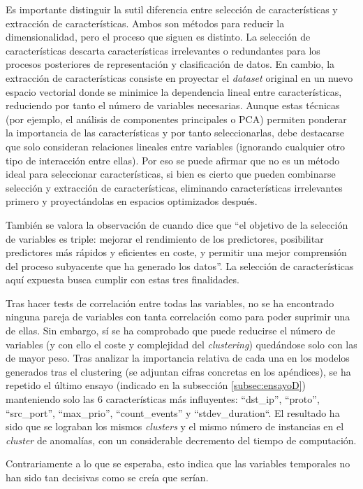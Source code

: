 Es importante distinguir la sutil diferencia entre selección de características y extracción de características.
Ambos son métodos para reducir la dimensionalidad, pero el proceso que siguen es distinto.
La selección de características descarta características irrelevantes o redundantes para los procesos posteriores de representación y clasificación de datos.
En cambio, la extracción de características consiste en proyectar el \emph{dataset} original en un nuevo espacio vectorial
donde se minimice la dependencia lineal entre características, reduciendo por tanto el número de variables necesarias.
Aunque estas técnicas (por ejemplo, el análisis de componentes principales o PCA) permiten ponderar la importancia de las características y por tanto seleccionarlas,
debe destacarse que solo consideran relaciones lineales entre variables (ignorando cualquier otro tipo de interacción entre ellas).
Por eso se puede afirmar que no es un método ideal para seleccionar características, si bien es cierto
que pueden combinarse selección y extracción de características, eliminando características irrelevantes primero y proyectándolas en espacios optimizados después.

También se valora la observación de \cite{Guyon_2003} cuando dice que ``el objetivo de la selección de variables es triple: mejorar el rendimiento de los predictores, posibilitar predictores más rápidos y eficientes en coste, y permitir una mejor comprensión del proceso subyacente que ha generado los datos''.
La selección de características aquí expuesta busca cumplir con estas tres finalidades.

Tras hacer tests de correlación entre todas las variables, no se ha encontrado ninguna pareja de variables con tanta correlación como para poder suprimir una de ellas.
Sin embargo, sí se ha comprobado que puede reducirse el número de variables (y con ello el coste y complejidad del \emph{clustering}) quedándose solo con las de mayor peso.
Tras analizar la importancia relativa de cada una en los modelos generados tras el clustering (se adjuntan cifras concretas en los apéndices),
se ha repetido el último ensayo (indicado en la subsección \ref{subsec:ensayoD}) manteniendo solo las 6 características más influyentes: ``dst\_ip'', ``proto'', ``src\_port'', ``max\_prio'', ``count\_events'' y ``stdev\_duration``.
El resultado ha sido que se lograban los mismos \emph{clusters} y el mismo número de instancias en el \emph{cluster} de anomalías, con un considerable decremento del tiempo de computación.

Contrariamente a lo que se esperaba, esto indica que las variables temporales no han sido tan decisivas como se creía que serían.

